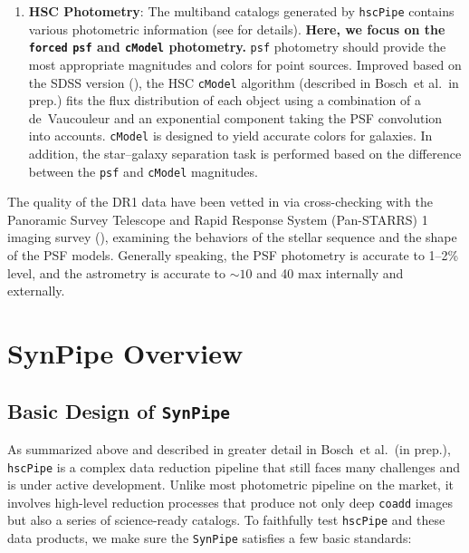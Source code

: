 \documentclass[useamsfonts]{pasj01}
\def\etal{{\ et al.~}}
\def\hscpipe{\texttt{hscPipe}}
\def\synpipe{\texttt{SynPipe}}
\def\cmodel{\texttt{cModel}}
\def\forced{\texttt{forced}}
\begin{document}
\begin{enumerate}
        \item \textbf{HSC Photometry}:
            The multiband catalogs generated by \hscpipe{} contains various photometric
            information (see \citealt{HSCDR1} for details).
            \textbf{Here, we focus on the \forced{} \texttt{psf} and \cmodel{}
            photometry.}
            \texttt{psf} photometry should provide the most appropriate magnitudes and
            colors for point sources.
            Improved based on the SDSS version (\citealt{Lupton2001, Abazajian2004}),
            the HSC \cmodel{}{} algorithm (described in Bosch\etal in prep.) fits the
            flux distribution of each object using a combination of a de~Vaucouleur
            and an exponential component taking the PSF convolution into accounts.
            \cmodel{} is designed to yield accurate colors for galaxies.
            In addition, the star--galaxy separation task is performed based on the
            difference between the \texttt{psf} and \cmodel{}{} magnitudes.

    \end{enumerate}

    The quality of the DR1 data have been vetted in \citet{HSCDR1} via cross-checking
    with the Panoramic Survey Telescope and Rapid Response System (Pan-STARRS) 1
    imaging survey (\citealt{Schlafly2012, Tonry2012, Magnier2013}), examining the
    behaviors of the stellar sequence and the shape of the PSF models.
    Generally speaking, the PSF photometry is accurate to 1--2\% level, and the
    astrometry is accurate to ${\sim}10$ and 40 max internally and externally.


\section{SynPipe Overview}
    \label{sec:synpipe}

\subsection{Basic Design of \synpipe{}}
    \label{ssec:design}

    As summarized above and described in greater detail in Bosch\etal (in prep.),
    \hscpipe{} is a complex data reduction pipeline that still faces many challenges
    and is under active development.
    Unlike most photometric pipeline on the market, it involves high-level reduction
    processes that produce not only deep \texttt{coadd} images but also a series of
    science-ready catalogs.
    To faithfully test \hscpipe{} and these data products, we make sure the
    \synpipe{} satisfies a few basic standards:
\end{document}
